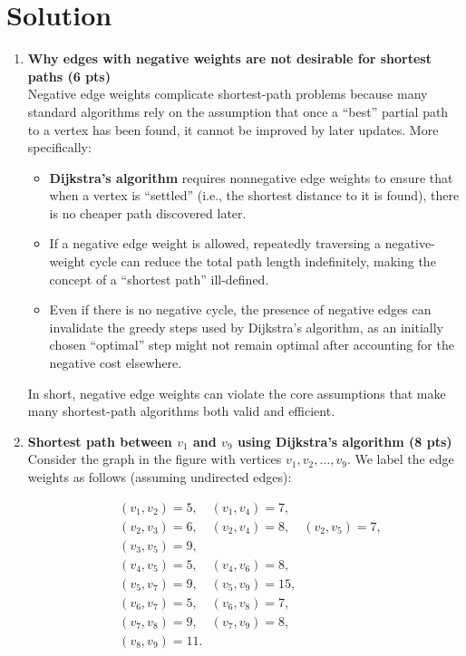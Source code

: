 \documentclass[a4paper,12pt]{article}
\begin{document}
\section*{Solution}

\begin{enumerate}
    \item \textbf{Why edges with negative weights are not desirable for shortest paths (6 pts)}\\[6pt]
    Negative edge weights complicate shortest-path problems because many standard algorithms rely on the assumption that once a “best” partial path to a vertex has been found, it cannot be improved by later updates. More specifically:
    \begin{itemize}
        \item \textbf{Dijkstra's algorithm} requires nonnegative edge weights to ensure that when a vertex is “settled” (i.e., the shortest distance to it is found), there is no cheaper path discovered later.
        \item If a negative edge weight is allowed, repeatedly traversing a negative-weight cycle can reduce the total path length indefinitely, making the concept of a “shortest path” ill-defined.
        \item Even if there is no negative cycle, the presence of negative edges can invalidate the greedy steps used by Dijkstra’s algorithm, as an initially chosen “optimal” step might not remain optimal after accounting for the negative cost elsewhere.
    \end{itemize}
    In short, negative edge weights can violate the core assumptions that make many shortest-path algorithms both valid and efficient.
    
    \item \textbf{Shortest path between \(v_1\) and \(v_9\) using Dijkstra’s algorithm (8 pts)}\\[6pt]
    Consider the graph in the figure with vertices \(v_1, v_2, \ldots, v_9\). We label the edge weights as follows (assuming undirected edges):

    \[
    \begin{aligned}
    &(v_1, v_2) = 5,\quad (v_1, v_4) = 7,\\
    &(v_2, v_3) = 6,\quad (v_2, v_4) = 8,\quad (v_2, v_5) = 7,\\
    &(v_3, v_5) = 9,\\
    &(v_4, v_5) = 5,\quad (v_4, v_6) = 8,\\
    &(v_5, v_7) = 9,\quad (v_5, v_9) = 15,\\
    &(v_6, v_7) = 5,\quad (v_6, v_8) = 7,\\
    &(v_7, v_8) = 9,\quad (v_7, v_9) = 8,\\
    &(v_8, v_9) = 11.
    \end{aligned}
    \]


\end{enumerate}
\end{document}
